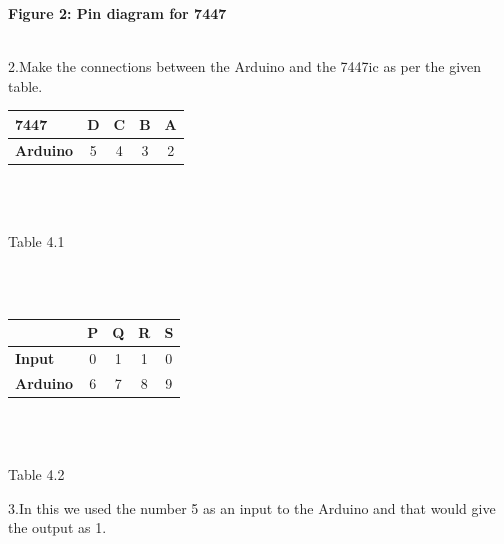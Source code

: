 \documentclass[10pt]{report}
\begin{document}
\begin{multicols}{2}
\begin{center}
\centering\textbf{Figure 2: Pin diagram for 7447} \\
\
\end{center}
\raggedright 
2.Make the connections between the Arduino and the 7447ic as per the given table.
\
\centering
\\\begin{tabular}{|l|c|c|c|c|}
\hline
\textbf{7447} & D & C & B & A\\
\hline
\textbf{Arduino} & 5 & 4 & 3 & 2\\
\hline
\end{tabular}\\
\
\centerline{Table 4.1}\\
\
\centering
\\\begin{tabular}{|l|c|c|c|c|}
\hline
& P & Q & R & S\\
\hline
\textbf{Input} & 0 & 1 & 1 & 0\\
\hline
\textbf{Arduino} & 6 & 7 & 8 & 9\\
\hline
\end{tabular}\\
\
\centerline{Table 4.2}
\raggedleft 3.In this we used the number 5 as an input to the Arduino and that would give the output as 1. 
\newpage
\centering

\end{multicols}
\end{document}
